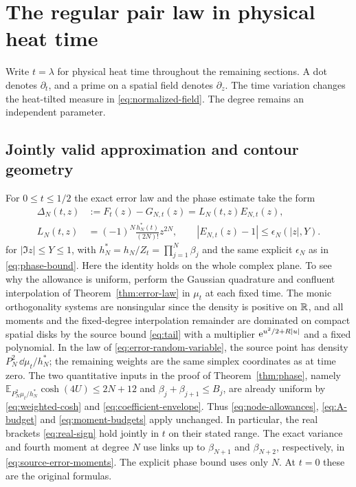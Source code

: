\section{The regular pair law in physical heat time}
\label{sec:gt-gap-transport}

Write \(t=\lambda\) for physical heat time throughout the remaining
sections. A dot denotes \(\partial_t\), and a prime on a spatial field
denotes \(\partial_z\). The time variation changes the heat-tilted
measure in \eqref{eq:normalized-field}. The degree remains an independent
parameter.

\subsection{Jointly valid approximation and contour geometry}
\label{sec:gt-physical-phase}

For \(0\le t\le1/2\) the exact error law and the phase estimate take
the form
\begin{equation}
 \begin{aligned}
 \Delta_N(t,z)&:=F_t(z)-G_{N,t}(z)=L_N(t,z)E_{N,t}(z),\\
 L_N(t,z)&=(-1)^N\frac{h_N^*(t)}{(2N)!}z^{2N},
 \qquad |E_{N,t}(z)-1|\le\epsilon_N(|z|,Y).
 \end{aligned}
 \label{eq:gt-physical-error}
\end{equation}
for \(|\Im z|\le Y\le1\), with \(h_N^*=h_N/Z_t=\prod_{j=1}^N\beta_j\)
and the same explicit \(\epsilon_N\) as in \eqref{eq:phase-bound}.
Here the identity holds on the whole complex plane. To see why the
allowance is uniform, perform the Gaussian quadrature and confluent
interpolation of Theorem~\ref{thm:error-law} in \(\mu_t\) at each fixed
time. The monic orthogonality systems are nonsingular since the
density is positive on \(\mathbb R\), and all moments and the fixed-degree
interpolation remainder are dominated on compact spatial disks by
the source bound \eqref{eq:tail} with a multiplier
\(\mathrm e^{u^2/2+R|u|}\) and a fixed polynomial. In the law of
\eqref{eq:error-random-variable}, the source point has density
\(P_N^2\,\dd\mu_t/h_N^*\); the remaining weights are the same simplex
coordinates as at time zero. The two quantitative inputs in the proof
of Theorem~\ref{thm:phase}, namely
\(\mathbb E_{P_N^2\mu_t/h_N^*}\cosh(4U)\le 2N+12\) and
\(\beta_j+\beta_{j+1}\le B_j\), are already uniform by
\eqref{eq:weighted-cosh} and \eqref{eq:coefficient-envelope}.
Thus \eqref{eq:node-allowances}, \eqref{eq:A-budget} and
\eqref{eq:moment-budgets} apply unchanged. In particular, the real
brackets \eqref{eq:real-sign} hold jointly in \(t\) on their stated
range. The exact variance and fourth moment at degree \(N\) use
links up to \(\beta_{N+1}\) and \(\beta_{N+2}\), respectively, in
\eqref{eq:source-error-moments}. The explicit phase bound uses only
\(N\). At \(t=0\) these are the original formulas.


